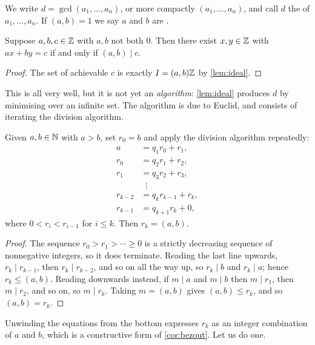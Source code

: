 \documentclass[a4paper]{scrartcl}
\begin{document}
\begin{definition}
	We write $d = \gcd(a_1, \dots, a_n)$, or more compactly $(a_1, \dots, a_n)$, and call $d$ the  of $a_1, \dots, a_n$. If $(a, b) = 1$ we say $a$ and $b$ are .
\end{definition}

\begin{corollary}[Bézout]\label{cor:bezout}
	Suppose $a, b, c \in \mathbb{Z}$ with $a, b$ not both $0$. Then there exist $x, y \in \mathbb{Z}$ with $ax + by = c$ if and only if $(a, b) \mid c$.
\end{corollary}
\begin{proof}
	The set of achievable $c$ is exactly $I = (a,b)\mathbb{Z}$ by \autoref{lem:ideal}.
\end{proof}

This is all very well, but it is not yet an \emph{algorithm}: \autoref{lem:ideal} produces $d$ by minimising over an infinite set. The algorithm is due to Euclid, and consists of iterating the division algorithm.

\begin{theorem}
	Given $a, b \in \mathbb{N}$ with $a > b$, set $r_0 = b$ and apply the division algorithm repeatedly:
	\begin{align*}
		a &= q_1 r_0 + r_1, \\
		r_0 &= q_2 r_1 + r_2, \\
		r_1 &= q_3 r_2 + r_3, \\
		&\;\;\vdots \\
		r_{k - 2} &= q_k r_{k-1} + r_k, \\
		r_{k-1} &= q_{k+1} r_k + 0,
	\end{align*}
	where $0 < r_i < r_{i-1}$ for $i \leq k$. Then $r_k = (a, b)$.
\end{theorem}
\begin{proof}
	The sequence $r_0 > r_1 > \cdots \geq 0$ is a strictly decreasing sequence of nonnegative integers, so it does terminate. Reading the last line upwards, $r_k \mid r_{k-1}$, then $r_k \mid r_{k-2}$, and so on all the way up, so $r_k \mid b$ and $r_k \mid a$; hence $r_k \leq (a,b)$. Reading downwards instead, if $m \mid a$ and $m \mid b$ then $m \mid r_1$, then $m \mid r_2$, and so on, so $m \mid r_k$. Taking $m = (a,b)$ gives $(a, b) \leq r_k$, and so $(a,b) = r_k$.
\end{proof}

Unwinding the equations from the bottom expresses $r_k$ as an integer combination of $a$ and $b$, which is a constructive form of \autoref{cor:bezout}. Let us do one.
\end{document}
